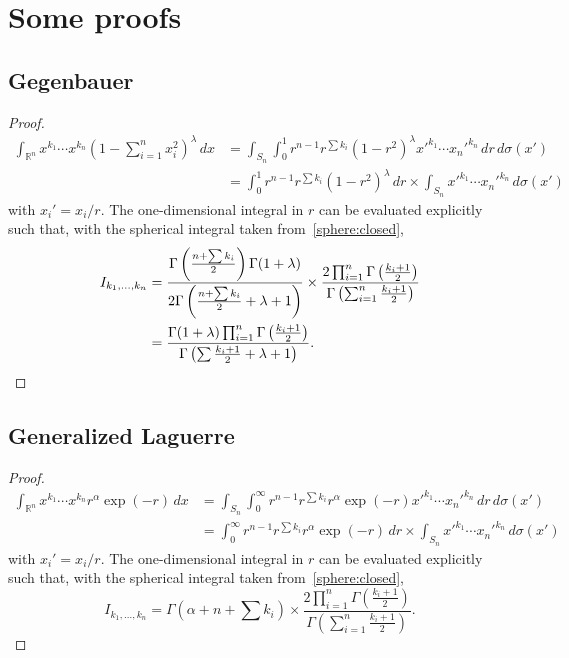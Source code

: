 \documentclass[final]{scrartcl}
\begin{document}
\appendix

\section{Some proofs}

\subsection{Gegenbauer}\label{gegenbauer:proof}
\begin{proof}
\[
\begin{split}
\int_{\mathbb{R}^n}  x^{k_1}\cdots x^{k_n} \left(1 - \sum_{i=1}^n x_i^2\right)^\lambda \,dx
&= \int_{S_n}\int_0^1 r^{n-1} r^{\sum{k_i}} (1-r^2)^\lambda x'^{k_1}\cdots x_n'^{k_n} \,dr\,d\sigma(x')\\
&= \int_0^1 r^{n-1} r^{\sum{k_i}} (1-r^2)^\lambda\,dr \times \int_{S_n} x'^{k_1}\cdots x_n'^{k_n} \,d\sigma(x')
\end{split}
\]
with $x_i' = x_i / r$. The one-dimensional integral in $r$ can be evaluated explicitly
  such that, with the spherical integral taken from~\eqref{sphere:closed},
\[
\begin{split}
I_{k_1,\dots,k_n}
&= \frac{\Gamma\left(\frac{n + \sum k_i}{2}\right)\Gamma(1+\lambda)}{2\Gamma\left(\frac{n+\sum k_i}{2} + \lambda + 1\right)}
\times
 \frac{2\prod_{i=1}^n\Gamma\left(\frac{k_i+1}{2}\right)}{\Gamma\left(\sum_{i=1}^n\frac{k_i+1}{2}\right)}\\
  &= \frac{%
  \Gamma(1+\lambda)\prod_{i=1}^n\Gamma\left(\frac{k_i+1}{2}\right)
}{%
\Gamma\left(\sum\frac{k_i+1}{2} + \lambda + 1\right)
}.
\end{split}
\]
\end{proof}

\subsection{Generalized Laguerre}\label{laguerre:proof}
\begin{proof}
\[
\begin{split}
  \int_{\mathbb{R}^n}  x^{k_1}\cdots x^{k_n} r^\alpha \exp(-r) \,dx
  &= \int_{S_n}\int_0^\infty r^{n-1} r^{\sum{k_i}} r^\alpha \exp(-r) x'^{k_1}\cdots x_n'^{k_n} \,dr\,d\sigma(x')\\
  &= \int_0^\infty r^{n-1} r^{\sum{k_i}} r^\alpha \exp(-r)\,dr \times \int_{S_n} x'^{k_1}\cdots x_n'^{k_n} \,d\sigma(x')
\end{split}
\]
with $x_i' = x_i / r$. The one-dimensional integral in $r$ can be evaluated explicitly
  such that, with the spherical integral taken from~\eqref{sphere:closed},
\[
I_{k_1,\dots,k_n}
  = \Gamma\left(\alpha + n + \sum k_i\right) \times
 \frac{2\prod_{i=1}^n\Gamma\left(\frac{k_i+1}{2}\right)}{\Gamma\left(\sum_{i=1}^n\frac{k_i+1}{2}\right)}.
\]
\end{proof}

{}

\end{document}
